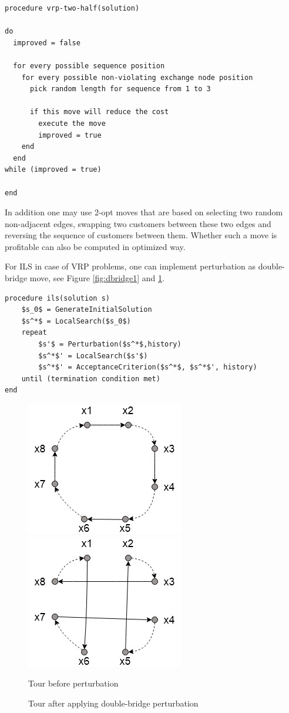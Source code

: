 \documentclass[12pt,a4paper,oneside]{book}
\begin{document}
\begin{minipage}[c, breaklines=true]{0.95\textwidth}
\begin{lstlisting}[caption={2.5-opt pseudo-code for VRP problems}, label={lst:vrp-two-half}]
procedure vrp-two-half(solution)

do
  improved = false
  
  for every possible sequence position
    for every possible non-violating exchange node position
      pick random length for sequence from 1 to 3
    
      if this move will reduce the cost
        execute the move
        improved = true
    end
  end
while (improved = true)

end
\end{lstlisting}
\end{minipage}

In addition one may use 2-opt moves that are based on selecting two random non-adjacent edges, swapping two customers between these two edges and reversing the sequence of customers between them. Whether such a move is profitable can also be computed in optimized way.

For ILS in case of VRP problems, one can implement perturbation as double-bridge move, see Figure \ref{fig:dbridge1} and \ref{fig:dbridge2}.

\begin{minipage}[c, breaklines=true]{0.95\textwidth}
\begin{lstlisting}[caption={Iterated Local Search outline}, label={lst:ils},mathescape]
procedure ils(solution s)
	$s_0$ = GenerateInitialSolution
	$s^*$ = LocalSearch($s_0$)
	repeat
		$s'$ = Perturbation($s^*$,history)
		$s^*$' = LocalSearch($s'$)
		$s^*$' = AcceptanceCriterion($s^*$, $s^*$', history)
	until (termination condition met)
end
\end{lstlisting}
\end{minipage}


\begin{multicols}{2}
\begin{figure}[ht!]
\includegraphics[width=.3\textwidth]{double-bridge/1.jpg}\hfill
\includegraphics[width=.3\textwidth]{double-bridge/2.jpg}
\caption{Tour before perturbation} \label{fig:dbridge1}
\caption{Tour after applying double-bridge perturbation} \label{fig:dbridge2}
\end{figure}
\end{multicols}
\end{document}
